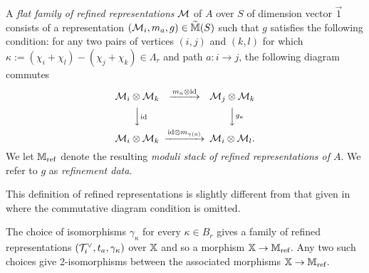 \documentclass[12pt]{amsart}
\begin{document}

\begin{definition} \label{def:refined}
A {\em flat family of refined representations} $\mathcal{M}$ of $A$ over $S$ of dimension vector $\vec{1}$ consists of a representation $(\mathcal{M}_i, m_a, g) \in \widetilde{\mathbb{M}}(S)$ such that $g$ satisfies the following condition: for any two pairs of vertices $(i,j)$ and $(k,l)$ for which $\kappa:= (\chi_i + \chi_l)-(\chi_j + \chi_k) \in \Lambda_r$ and path $a \colon i \rightarrow j$, the following diagram commutes
\begin{equation}  \label{eq:refined}
\begin{CD}
\cM_i \otimes \cM_k @>m_a \otimes \text{id}>> \cM_j \otimes \cM_k\\
@VV\text{id}V @VVg_{\kappa}V\\
\cM_i \otimes \cM_k @>\text{id} \otimes m_{\gamma(a)}>> \cM_i \otimes \cM_l.
\end{CD}
\end{equation}
We let $\mathbb{M}_{\text{ref}}$ denote the resulting {\em moduli stack of refined representations of $A$}. We refer to $g$ as {\em refinement data}.
\end{definition}

\begin{remark}
This definition of refined representations is slightly different from that given in \cite[Definition 3.2]{Abd} where the commutative diagram condition is omitted.
\end{remark}

The choice of isomorphisms $\gamma_\kappa$ for every $\kappa \in B_r$ gives a family of refined representations $(\mathcal{T}_i^\vee, t_a, \gamma_\kappa)$ over $\mathbb{X}$ and so a morphism $\mathbb{X} \rightarrow \mathbb{M}_\text{ref}$.
Any two such choices give 2-isomorphisms between the associated morphisms $\mathbb{X} \rightarrow \mathbb{M}_\text{ref}$.
\end{document}
